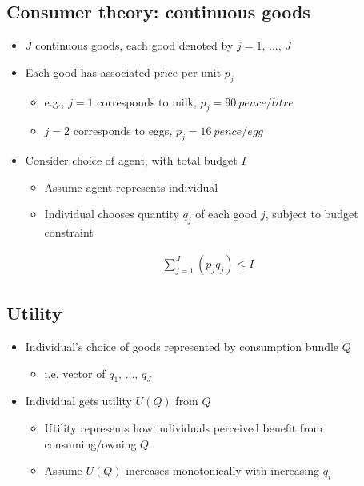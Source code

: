 \subsection{Consumer theory: continuous goods}
\begin{itemize}
  \item $J$ continuous goods, each good denoted by $j = 1, \, ..., \, J$
  \item Each good has associated price per unit $p_j$
        \begin{itemize}
          \item e.g., $j = 1$ corresponds to milk, $p_j = \SI{90}{pence\per litre}$
          \item $j = 2$ corresponds to eggs, $p_j = \SI{16}{pence \per egg}$
        \end{itemize}
  \item Consider choice of agent, with total budget $I$
        \begin{itemize}
          \item Assume agent represents individual
          \item Individual chooses quantity $q_j$ of each good $j$, subject to budget constraint
        \end{itemize}
\end{itemize}
\begin{gather}
  \sum_{j=1}^{J} \left(p_jq_j\right) \leq I
\end{gather}
\subsection{Utility}
\begin{itemize}
  \item Individual's choice of goods represented by consumption bundle $Q$
        \begin{itemize}
          \item i.e. vector of $q_1, \, ..., \, q_J$
        \end{itemize}
  \item Individual gets utility $U\left(Q\right)$ from $Q$
        \begin{itemize}
          \item Utility represents how individuals perceived benefit from consuming/owning $Q$
          \item Assume $U\left(Q\right)$ increases monotonically with increasing $q_i$
        \end{itemize}
\end{itemize}
